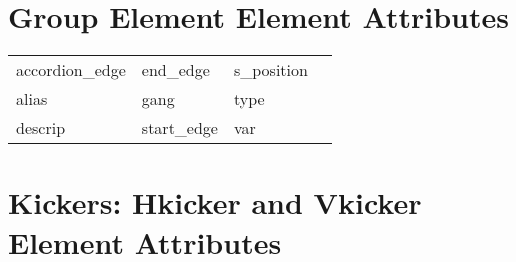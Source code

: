  \section{Group Element Element Attributes}
 \label{s:list.group}
 
 \begin{tabular}{llll} \toprule
accordion_edge              & end_edge                    & s_position                  &                             \\
alias                       & gang                        & type                        &                             \\
descrip                     & start_edge                  & var                         &                             \\
 \bottomrule
 \end{tabular}
 \vfill
 
 \section{Kickers: Hkicker and Vkicker Element Attributes}
 \label{s:list.hvkicker}
 
